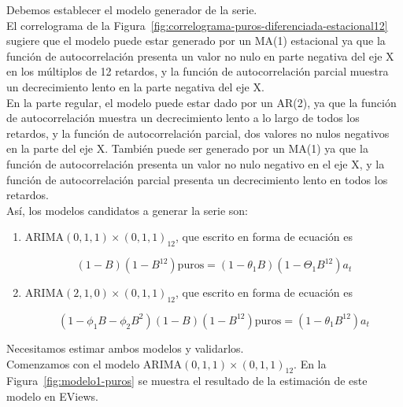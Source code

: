\documentclass[12pt,a4paper,twoside,openright,titlepage,final]{article}
\begin{document}
Debemos establecer el modelo generador de la serie.\\

El correlograma de la Figura~\ref{fig:correlograma-puros-diferenciada-estacional12} sugiere que el modelo puede estar generado por un MA(1) estacional ya que la función de autocorrelación presenta un valor no nulo en parte negativa del eje X en los múltiplos de 12 retardos, y la función de autocorrelación parcial muestra un decrecimiento lento en la parte negativa del eje X.\\

En la parte regular, el modelo puede estar dado por un AR(2), ya que la función de autocorrelación muestra un decrecimiento lento a lo largo de todos los retardos, y la función de autocorrelación parcial, dos valores no nulos negativos en la parte del eje X. También puede ser generado por un MA(1) ya que la función de autocorrelación presenta un valor no nulo negativo en el eje X, y la función de autocorrelación parcial presenta un decrecimiento lento en todos los retardos.\\

Así, los modelos candidatos a generar la serie son:

\begin{enumerate}
	\item ARIMA$(0,1,1)\times(0,1,1)_{12}$, que escrito en forma de ecuación es
	
	\[ (1-B) (1-B^{12}) \text{puros} = (1-\theta_1 B)(1-\Theta_{1}B^{12}) a_t \] 
	\item ARIMA$(2,1,0)\times(0,1,1)_{12}$, que escrito en forma de ecuación es
	
	\[ (1-\phi_1 B - \phi_2 B^2)(1-B) (1-B^{12}) \text{puros} = (1-\theta_{1}B^{12}) a_t \] 
\end{enumerate}

Necesitamos estimar ambos modelos y validarlos.\\

Comenzamos con el modelo ARIMA$(0,1,1)\times(0,1,1)_{12}$. En la Figura~\ref{fig:modelo1-puros} se muestra el resultado de la estimación de este modelo en EViews.\\
\end{document}
